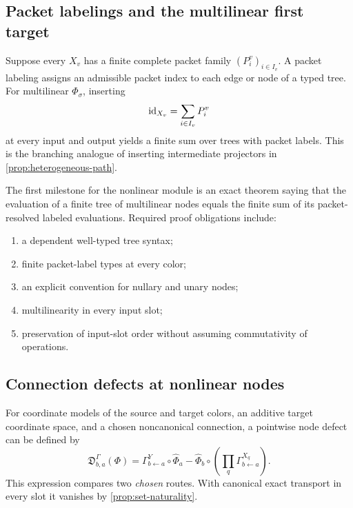 \subsection{Packet labelings and the multilinear first target}

Suppose every $X_v$ has a finite complete packet family
$(P^v_i)_{i\in I_v}$.  A packet labeling assigns an admissible packet index
to each edge or node of a typed tree.  For multilinear $\Phi_\sigma$, inserting
\[
\operatorname{id}_{X_v}=\sum_{i\in I_v}P^v_i
\]
at every input and output yields a finite sum over trees with packet labels.
This is the branching analogue of inserting intermediate projectors in
\cref{prop:heterogeneous-path}.

\begin{roadmap}
\label{roadmap:multilinear-tree}
The first milestone for the nonlinear module is an exact theorem saying that the
evaluation of a finite tree of multilinear nodes equals the finite sum of its
packet-resolved labeled evaluations.  Required proof obligations include:
\begin{enumerate}[label=(\alph*)]
\item a dependent well-typed tree syntax;
\item finite packet-label types at every color;
\item an explicit convention for nullary and unary nodes;
\item multilinearity in every input slot;
\item preservation of input-slot order without assuming commutativity of
operations.
\end{enumerate}
\end{roadmap}

\subsection{Connection defects at nonlinear nodes}

For coordinate models of the source and target colors, an additive target
coordinate space, and a chosen noncanonical connection, a pointwise node
defect can be defined by
\[
\mathfrak D^\Gamma_{b,a}(\Phi)
=
\Gamma^Y_{b\leftarrow a}\circ\widehat\Phi_a
-
\widehat\Phi_b\circ
\left(\prod_q\Gamma^{X_q}_{b\leftarrow a}\right).
\]
This expression compares two \emph{chosen} routes.  With canonical exact
transport in every slot it vanishes by \cref{prop:set-naturality}.

